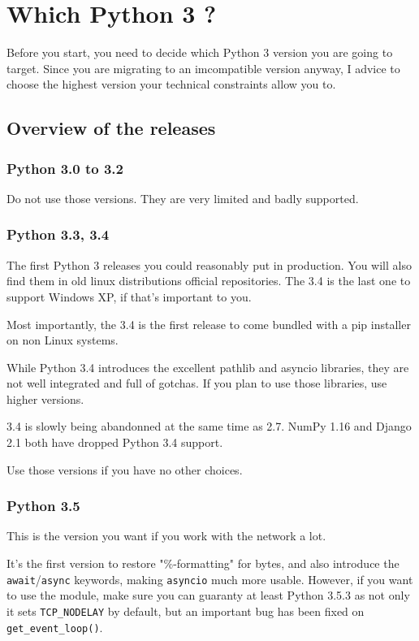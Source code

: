 \chapter{Which Python 3 ?}

Before you start, you need to decide which Python 3 version you are going to target. Since you are migrating to an imcompatible version anyway, I advice to choose the highest version your technical constraints allow you to.

\section{Overview of the releases}

\subsection{Python 3.0 to 3.2}

Do not use those versions. They are very limited and badly supported.

\subsection{Python 3.3, 3.4}

The first Python 3 releases you could reasonably put in production. You will also find them in old linux distributions official repositories. The 3.4 is the last one to support Windows XP, if that's important to you.

Most importantly, the 3.4 is the first release to come bundled with a pip installer on non Linux systems.

While Python 3.4 introduces the excellent pathlib and asyncio libraries, they are not well integrated and full of gotchas. If you plan to use those libraries, use higher versions.

3.4 is slowly being abandonned at the same time as 2.7. NumPy 1.16 and Django 2.1 both have dropped Python 3.4 support.

Use those versions if you have no other choices.

\subsection{Python 3.5}

This is the version you want if you work with the network a lot.

It's the first version to restore "\%-formatting" for bytes, and also introduce the \lstinline{await}/\lstinline{async} keywords, making \lstinline{asyncio} much more usable. However, if you want to use the module, make sure you can guaranty at least Python 3.5.3 as not only it sets \lstinline{TCP_NODELAY} by default, but an important bug has been fixed on \lstinline{get_event_loop()}.

